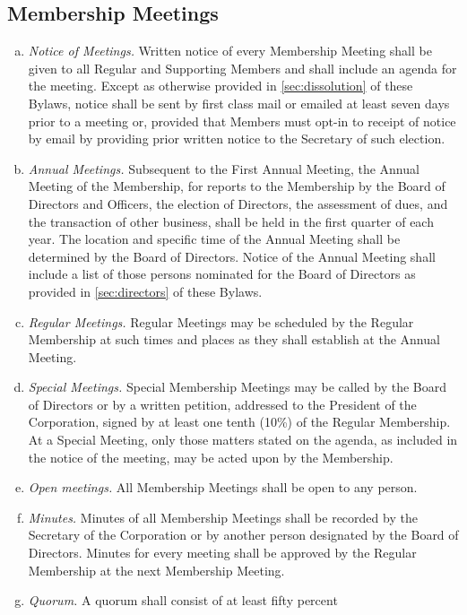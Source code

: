 \subsection{Membership Meetings}
\begin{enumerate}[a.]
\item \emph{Notice of Meetings.}  Written notice of every Membership
  Meeting shall be given to all Regular and Supporting Members and
  shall include an agenda for the meeting. Except as otherwise
  provided in \ref{sec:dissolution} of these Bylaws, notice shall be
  sent by first class mail or emailed at least seven days prior to a
  meeting or, provided that Members must opt-in to receipt of notice
  by email by providing prior written notice to the Secretary of such
  election.
\item \emph{Annual Meetings.}  Subsequent to the First Annual Meeting,
  the Annual Meeting of the Membership, for reports to the Membership
  by the Board of Directors and Officers, the election of Directors,
  the assessment of dues, and the transaction of other business, shall
  be held in the first quarter of each year. The location and
  specific time of the Annual Meeting shall be determined by the Board
  of Directors. Notice of the Annual Meeting shall include a list of
  those persons nominated for the Board of Directors as provided in
  \ref{sec:directors} of these Bylaws.
\item \emph{Regular Meetings.}  Regular Meetings may be scheduled by
  the Regular Membership at such times and places as they shall
  establish at the Annual Meeting.
\item \emph{Special Meetings.}  Special Membership Meetings may be
  called by the Board of Directors or by a written petition, addressed
  to the President of the Corporation, signed by at least one tenth
  (10\%) of the Regular Membership. At a Special Meeting, only those
  matters stated on the agenda, as included in the notice of the
  meeting, may be acted upon by the Membership.
\item \emph{Open meetings.}  All Membership Meetings shall be open to
  any person.
\item \emph{Minutes.}  Minutes of all Membership Meetings shall be
  recorded by the Secretary of the Corporation or by another person
  designated by the Board of Directors. Minutes for every meeting
  shall be approved by the Regular Membership at the next Membership
  Meeting.
\item \emph{Quorum.}  A quorum shall consist of at least fifty percent

\end{enumerate}

